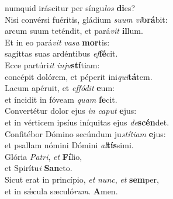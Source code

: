 \evenverse numquid iráscitur per síngu\textit{los} \textbf{di}es?\\
\oddverse Nisi convérsi fuéritis, gládium \textit{su}\textit{um} \textit{vi}\textbf{brá}bit:~\*\\
\oddverse arcum suum teténdit, et pará\textit{vit} \textbf{il}lum.\\
\evenverse Et in eo pará\textit{vit} \textit{va}\textit{sa} \textbf{mor}tis:~\*\\
\evenverse sagíttas suas ardéntibus \textit{ef}\textbf{fé}cit.\\
\oddverse Ecce partúri\textit{it} \textit{in}\textit{ju}\textbf{stí}tiam:~\*\\
\oddverse concépit dolórem, et péperit ini\textit{qui}\textbf{tá}tem.\\
\evenverse Lacum apéruit, et \textit{ef}\textit{fó}\textit{dit} \textbf{e}um:~\*\\
\evenverse et íncidit in fóveam \textit{quam} \textbf{fe}cit.\\
\oddverse Convertétur dolor ejus \textit{in} \textit{ca}\textit{put} \textbf{e}jus:~\*\\
\oddverse et in vérticem ipsíus iníquitas ejus \textit{de}\textbf{scén}det.\\
\evenverse Confitébor Dómino secúndum ju\textit{stí}\textit{ti}\textit{am} \textbf{e}jus:~\*\\
\evenverse et psallam nómini Dómini \textit{al}\textbf{tís}simi.\\
\oddverse Glória \textit{Pa}\textit{tri}, \textit{et} \textbf{Fí}lio,~\*\\
\oddverse et Spirítu\textit{i} \textbf{San}cto.\\
\evenverse Sicut erat in princípio, \textit{et} \textit{nunc}, \textit{et} \textbf{sem}per,~\*\\
\evenverse et in sǽcula sæculó\textit{rum}. \textbf{A}men.\\
